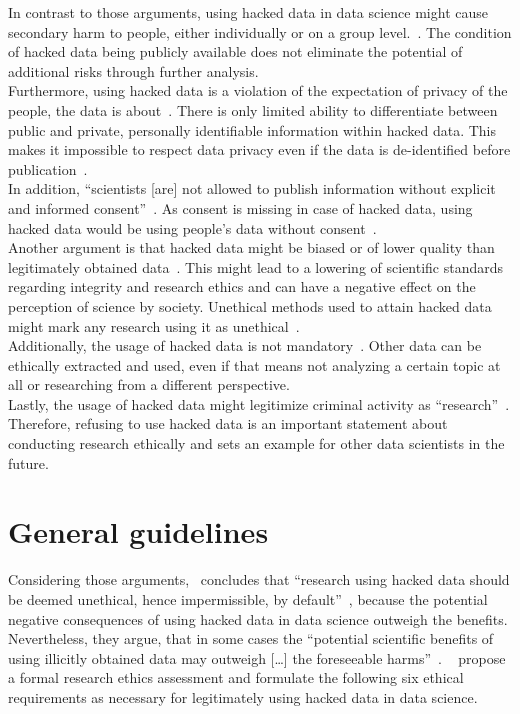 In contrast to those arguments, using hacked data in data science might cause secondary harm to people, either individually or on a group level.~\parencites[][746]{nature}[23]{acm}.
The condition of hacked data being publicly available does not eliminate the potential of additional risks through further analysis.\\
Furthermore, using hacked data is a violation of the expectation of privacy of the people, the data is about~\parencite[][5]{patreon}.
There is only limited ability to differentiate between public and private, personally identifiable information within hacked data.
This makes it impossible to respect data privacy even if the data is de-identified before publication~\parencite[][746]{nature}.\\
In addition, ``scientists [are] not allowed to publish information without explicit and informed consent''~\parencite[][745]{nature}.
As consent is missing in case of hacked data, using hacked data would be using people's data without consent~\parencite[][5]{patreon}.\\
Another argument is that hacked data might be biased or of lower quality than legitimately obtained data~\parencite[][746]{nature}.
This might lead to a lowering of scientific standards regarding integrity and research ethics and can have a negative effect on the perception of science by society.
Unethical methods used to attain hacked data might mark any research using it as unethical~\parencite[][24]{acm}.\\
Additionally, the usage of hacked data is not mandatory~\parencite[][5]{patreon}.
Other data can be ethically extracted and used, even if that means not analyzing a certain topic at all or researching from a different perspective.\\
Lastly, the usage of hacked data might legitimize criminal activity as ``research''~\parencites[][5]{patreon}[][24]{acm}.
Therefore, refusing to use hacked data is an important statement about conducting research ethically and sets an example for other data scientists in the future.

\section*{General guidelines}

Considering those arguments,~\textcite{nature} concludes that ``research using hacked data should be deemed unethical, hence impermissible, by default''~\parencite[][747]{nature}, because the potential negative consequences of using hacked data in data science outweigh the benefits.
Nevertheless, they argue, that in some cases the ``potential scientific benefits of using illicitly obtained data may outweigh [\ldots] the foreseeable harms''~\parencite[][747]{nature}.
~\textcite[747-748]{nature} propose a formal research ethics assessment and formulate the following six ethical requirements as necessary for legitimately using hacked data in data science.

